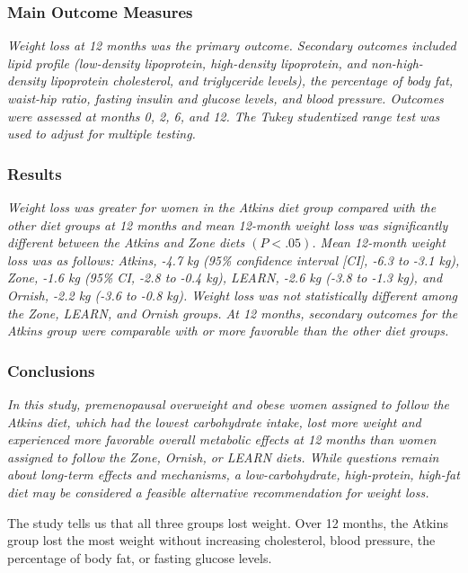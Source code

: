 \documentclass[11pt, chapterprefix=true]{scrbook}\usepackage[]{graphicx}\usepackage[]{color}
\begin{document}
\subsubsection{Main Outcome Measures}

\textit{Weight loss at 12 months was the primary outcome.  Secondary outcomes included lipid profile (low-density lipoprotein, high-density lipoprotein, and non-high-density lipoprotein cholesterol, and triglyceride levels), the percentage of body fat, waist-hip ratio, fasting insulin and glucose levels, and blood pressure. Outcomes were assessed at months 0, 2, 6, and 12. The Tukey studentized range test was used to adjust for multiple testing.}

\subsubsection{Results}

\textit{Weight loss was greater for women in the Atkins diet group compared with the other diet groups at 12 months and mean 12-month weight loss was significantly different between the Atkins and Zone diets $(P<.05)$. Mean 12-month weight loss was as follows: Atkins, -4.7 kg (95\% confidence interval [CI], -6.3 to -3.1 kg), Zone, -1.6 kg (95\% CI, -2.8 to -0.4 kg), LEARN, -2.6 kg (-3.8 to -1.3 kg), and Ornish, -2.2 kg (-3.6 to -0.8 kg). Weight loss was not statistically different among the Zone, LEARN, and Ornish groups. At 12 months, secondary outcomes for the Atkins group were comparable with or more favorable than the other diet groups.}

\subsubsection{Conclusions}

\textit{In this study, premenopausal overweight and obese women assigned to follow the Atkins diet, which had the lowest carbohydrate intake, lost more weight and experienced more favorable overall metabolic effects at 12 months than women assigned to follow the Zone, Ornish, or LEARN diets. While questions remain about long-term effects and mechanisms, a low-carbohydrate, high-protein, high-fat diet may be considered a feasible alternative recommendation for weight loss.}

The study tells us that all three groups lost weight.  Over 12 months, the Atkins group lost the most weight without increasing cholesterol, blood pressure, the percentage of body fat, or fasting glucose levels.
\end{document}
